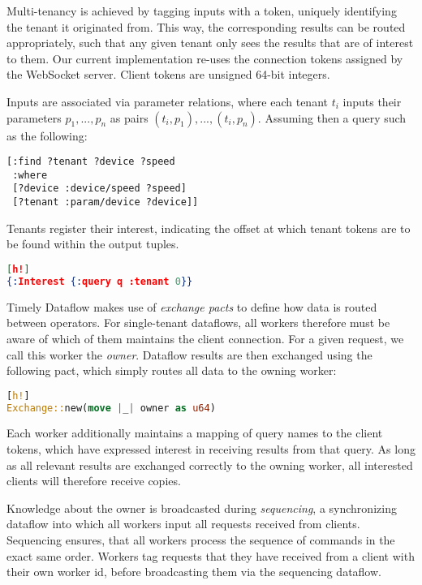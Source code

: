 \documentclass[../index.tex]{subfiles}
\begin{document}
Multi-tenancy is achieved by tagging inputs with a token, uniquely
identifying the tenant it originated from. This way, the corresponding
results can be routed appropriately, such that any given tenant only
sees the results that are of interest to them. Our current
implementation re-uses the connection tokens assigned by the WebSocket
server. Client tokens are unsigned 64-bit integers.

Inputs are associated via parameter relations, where each tenant $t_i$
inputs their parameters $p_1, ..., p_n$ as pairs
$(t_i,p_1),...,(t_i,p_n)$. Assuming then a query such as the
following:

\begin{verbatim}
[:find ?tenant ?device ?speed
 :where
 [?device :device/speed ?speed]
 [?tenant :param/device ?device]]
\end{verbatim}

Tenants register their interest, indicating the offset at which tenant
tokens are to be found within the output tuples.

\begin{lstlisting}[language=json][h!]
{:Interest {:query q :tenant 0}}
\end{lstlisting}

Timely Dataflow makes use of \emph{exchange pacts} to define how data
is routed between operators. For single-tenant dataflows, all workers
therefore must be aware of which of them maintains the client
connection. For a given request, we call this worker the
\emph{owner}. Dataflow results are then exchanged using the following
pact, which simply routes all data to the owning worker:

\begin{lstlisting}[language=Rust, style=colouredRust][h!]
Exchange::new(move |_| owner as u64)
\end{lstlisting}

Each worker additionally maintains a mapping of query names to the
client tokens, which have expressed interest in receiving results from
that query. As long as all relevant results are exchanged correctly to
the owning worker, all interested clients will therefore receive
copies.

Knowledge about the owner is broadcasted during \emph{sequencing}, a
synchronizing dataflow into which all workers input all requests
received from clients. Sequencing ensures, that all workers process
the sequence of commands in the exact same order. Workers tag requests
that they have received from a client with their own worker id, before
broadcasting them via the sequencing dataflow.
\end{document}
